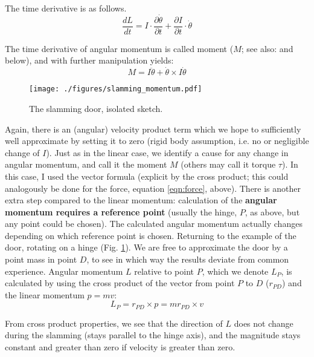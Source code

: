 \documentclass[10pt,a4paper]{article}
\begin{document}
The time derivative is as follows.
\[\frac{dL}{dt} = I \cdot \frac{\partial \dot \theta}{\partial t} + \frac{\partial I}{\partial t} \cdot \dot \theta\]

The time derivative of angular momentum is called moment (\(M\); see also: \citet{WikipediaNewtonEuler,WikipediaTorque} and below), and with further manipulation \citep[details in][p. 242, eqn. 8.23; otherwise see Fig. \ref{fig:miracle}]{Lynch2017} yields:
\begin{equation}\label{eqn:moment}
M = I \ddot\theta + \dot\theta \times I\dot\theta
\end{equation}



\begin{figure}[p]
\centering
\texttt{[image: ./figures/slamming\_momentum.pdf]}
\caption{\label{fig:slamming_momentum}The slamming door, isolated sketch.}
\end{figure}

Again, there is an (angular) velocity product term which we hope to sufficiently well approximate by setting it to zero (rigid body assumption, i.e. no or negligible change of \(I\)).
Just as in the linear case, we identify a cause for any change in angular momentum, and call it the moment \(M\) (others may call it torque \(\tau\)).
In this case, I used the vector formula (explicit by the cross product; this could analogously be done for the force, equation \eqref{eqn:force}, above).
There is another extra step compared to the linear momentum: calculation of the \textbf{angular momentum requires a reference point} (usually the hinge, \(P\), as above, but any point could be chosen).
The calculated angular momentum actually changes depending on which reference point is chosen.
Returning to the example of the door, rotating on a hinge (Fig. \ref{fig:slamming_momentum}).
We are free to approximate the door by a point mass in point \(D\), to see in which way the results deviate from common experience.
Angular momentum \(L\) relative to point \(P\), which we denote \(L_P\), is calculated by using the cross product of the vector from point \(P\) to \(D\) (\(r_{PD}\)) and the linear momentum \(p=mv\):
\[L_{P} = r_{PD} \times p = m r_{PD} \times v \]

From cross product properties, we see that the direction of \(L\) does not change during the slamming (stays parallel to the hinge axis), and the magnitude stays constant and greater than zero if velocity is greater than zero.
\end{document}
